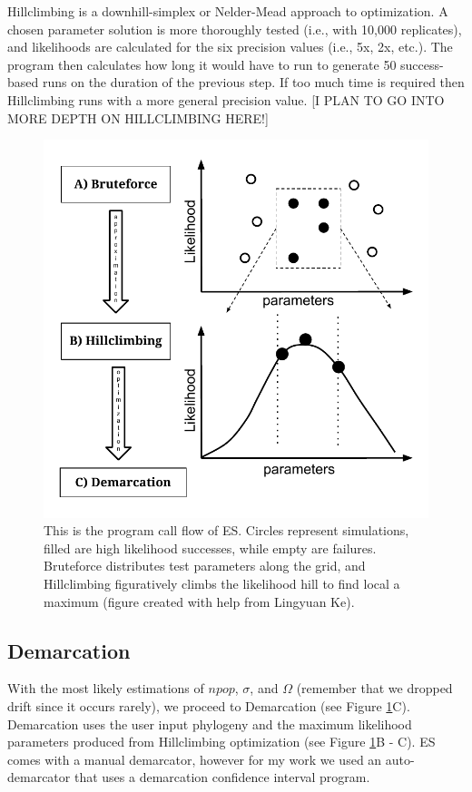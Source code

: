 Hillclimbing is a downhill-simplex or Nelder-Mead approach to optimization.
A chosen parameter solution is more thoroughly tested (i.e., with 10,000 replicates), and likelihoods are calculated for the six precision values (i.e., 5x, 2x, etc.).
The program then calculates how long it would have to run to generate 50 success-based runs on the duration of the previous step.
If too much time is required then Hillclimbing runs with a more general precision value.
[I PLAN TO GO INTO MORE DEPTH ON HILLCLIMBING HERE!]


\begin{figure}[h!]
 \centering
 \includegraphics[scale=0.75]{images/ESFlow-CH2.pdf}
 \caption[Ecotype Simulation program flow diagram.]{This is the program call flow of ES. Circles represent simulations, filled are high likelihood successes, while empty are failures. Bruteforce distributes test parameters along the grid, and Hillclimbing figuratively climbs the likelihood hill to find local a maximum (figure created with help from Lingyuan Ke). }
 \label{fig:Flow}
\end{figure}

\subsection*{Demarcation}
With the most likely estimations of $npop$, $\sigma$, and $\Omega$ (remember that we dropped drift since it occurs rarely), we proceed to Demarcation (see Figure \ref{fig:Flow}C).
Demarcation uses the user input phylogeny and the maximum likelihood parameters produced from Hillclimbing optimization (see Figure \ref{fig:Flow}B - C).
ES comes with a manual demarcator, however for my work we used an auto-demarcator that uses a demarcation confidence interval program.

